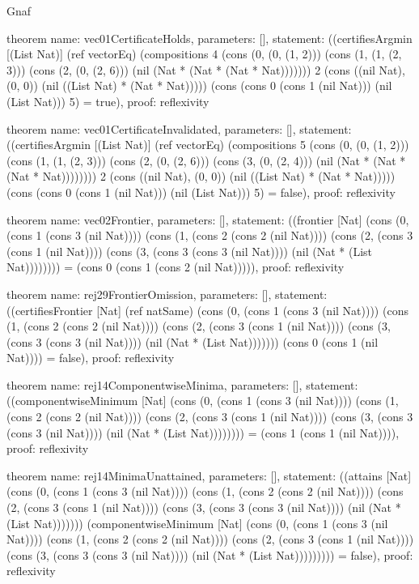 \begin{lexlean}{Gnaf}
\begin{semanticmodule}
theorem{
  name: vec01CertificateHolds,
  parameters: [],
  statement: ((certifiesArgmin [(List Nat)] (ref vectorEq) (compositions 4 (cons (0, (0, (1, 2))) (cons (1, (1, (2, 3))) (cons (2, (0, (2, 6))) (nil (Nat * (Nat * (Nat * Nat))))))) 2 (cons ((nil Nat), (0, 0)) (nil ((List Nat) * (Nat * Nat))))) (cons (cons 0 (cons 1 (nil Nat))) (nil (List Nat))) 5) = true),
  proof: reflexivity{}
}

theorem{
  name: vec01CertificateInvalidated,
  parameters: [],
  statement: ((certifiesArgmin [(List Nat)] (ref vectorEq) (compositions 5 (cons (0, (0, (1, 2))) (cons (1, (1, (2, 3))) (cons (2, (0, (2, 6))) (cons (3, (0, (2, 4))) (nil (Nat * (Nat * (Nat * Nat)))))))) 2 (cons ((nil Nat), (0, 0)) (nil ((List Nat) * (Nat * Nat))))) (cons (cons 0 (cons 1 (nil Nat))) (nil (List Nat))) 5) = false),
  proof: reflexivity{}
}

theorem{
  name: vec02Frontier,
  parameters: [],
  statement: ((frontier [Nat] (cons (0, (cons 1 (cons 3 (nil Nat)))) (cons (1, (cons 2 (cons 2 (nil Nat)))) (cons (2, (cons 3 (cons 1 (nil Nat)))) (cons (3, (cons 3 (cons 3 (nil Nat)))) (nil (Nat * (List Nat)))))))) = (cons 0 (cons 1 (cons 2 (nil Nat))))),
  proof: reflexivity{}
}

theorem{
  name: rej29FrontierOmission,
  parameters: [],
  statement: ((certifiesFrontier [Nat] (ref natSame) (cons (0, (cons 1 (cons 3 (nil Nat)))) (cons (1, (cons 2 (cons 2 (nil Nat)))) (cons (2, (cons 3 (cons 1 (nil Nat)))) (cons (3, (cons 3 (cons 3 (nil Nat)))) (nil (Nat * (List Nat))))))) (cons 0 (cons 1 (nil Nat)))) = false),
  proof: reflexivity{}
}

theorem{
  name: rej14ComponentwiseMinima,
  parameters: [],
  statement: ((componentwiseMinimum [Nat] (cons (0, (cons 1 (cons 3 (nil Nat)))) (cons (1, (cons 2 (cons 2 (nil Nat)))) (cons (2, (cons 3 (cons 1 (nil Nat)))) (cons (3, (cons 3 (cons 3 (nil Nat)))) (nil (Nat * (List Nat)))))))) = (cons 1 (cons 1 (nil Nat)))),
  proof: reflexivity{}
}

theorem{
  name: rej14MinimaUnattained,
  parameters: [],
  statement: ((attains [Nat] (cons (0, (cons 1 (cons 3 (nil Nat)))) (cons (1, (cons 2 (cons 2 (nil Nat)))) (cons (2, (cons 3 (cons 1 (nil Nat)))) (cons (3, (cons 3 (cons 3 (nil Nat)))) (nil (Nat * (List Nat))))))) (componentwiseMinimum [Nat] (cons (0, (cons 1 (cons 3 (nil Nat)))) (cons (1, (cons 2 (cons 2 (nil Nat)))) (cons (2, (cons 3 (cons 1 (nil Nat)))) (cons (3, (cons 3 (cons 3 (nil Nat)))) (nil (Nat * (List Nat))))))))) = false),
  proof: reflexivity{}
}


\end{semanticmodule}
\end{lexlean}
